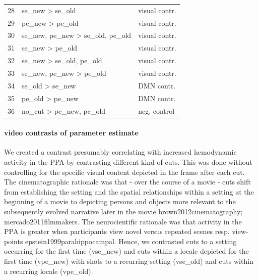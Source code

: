 \documentclass[english]{article}
\begin{document}
\begin{table}
\begin{tabular}{lll}
28 & se\_new > se\_old & visual contr. \\
29 & pe\_new > pe\_old & visual contr. \\
30 & se\_new, pe\_new > se\_old, pe\_old & visual contr. \\
31 & se\_new > pe\_old & visual contr. \\
32 & se\_new > se\_old, pe\_old & visual contr. \\
33 & se\_new, pe\_new > pe\_old & visual contr. \\
34 & se\_old > se\_new & DMN  contr. \\
35 & pe\_old > pe\_new &  DMN contr. \\
36 & no\_cut > pe\_new, pe\_old & neg. control \\
\bottomrule
\end{tabular}
\end{table}

\paragraph{video contrasts of parameter estimate}
We created a contrast presumably correlating with increased hemodynamic activity in the PPA by contrasting different kind of cuts. This was done without controlling for the specific visual content depicted in the frame after each cut. The cinematographic rationale was that - over the course of a movie - cuts shift from establishing the setting and the spatial relationships within a setting at the beginning of a movie to depicting persons and objects more relevant to the subsequently evolved narrative later in the movie {brown2012cinematography; mercado2011filmmakers}. The neurocientific rationale was that activity in the PPA is greater when participants view novel versus repeated scenes resp. view-points {epstein1999parahippocampal}. Hence, we contrasted cuts to a setting occurring for the first time (vse\_new) and cuts within a locale depicted for the first time (vpe\_new) with shots to a recurring setting (vse\_old) and cuts within a recurring locale (vpe\_old).
\end{document}
